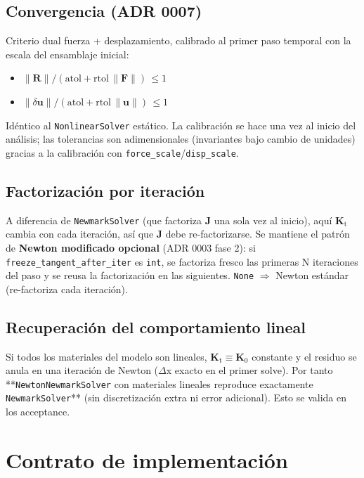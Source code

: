 \documentclass[11pt,letterpaper,oneside]{report}
\begin{document}
\subsection{Convergencia (ADR 0007)}

Criterio dual fuerza + desplazamiento, calibrado al primer paso temporal con
la escala del ensamblaje inicial:

\begin{itemize}
  \item $\|\mathbf R\|/(\text{atol} + \text{rtol}\,\|\mathbf F\|)\,\leq 1$
  \item $\|\delta \mathbf u\|/(\text{atol} + \text{rtol}\,\|\mathbf u\|)\,\leq 1$
\end{itemize}

Idéntico al \texttt{NonlinearSolver} estático. La calibración se hace una vez al
inicio del análisis; las tolerancias son adimensionales (invariantes bajo
cambio de unidades) gracias a la calibración con \texttt{force\_scale}/\texttt{disp\_scale}.

\subsection{Factorización por iteración}

A diferencia de \texttt{NewmarkSolver} (que factoriza $\mathbf J$ una sola vez al
inicio), aquí $\mathbf K_\text{t}$ cambia con cada iteración, así que $\mathbf J$
debe re-factorizarse. Se mantiene el patrón de \textbf{Newton modificado opcional}
(ADR 0003 fase 2): si \texttt{freeze\_tangent\_after\_iter} es \texttt{int}, se factoriza fresco
las primeras N iteraciones del paso y se reusa la factorización en las
siguientes. \texttt{None} \ensuremath{\Rightarrow} Newton estándar (re-factoriza cada iteración).

\subsection{Recuperación del comportamiento lineal}

Si todos los materiales del modelo son lineales, $\mathbf K_\text{t} \equiv \mathbf K_0$
constante y el residuo se anula en una iteración de Newton (\ensuremath{\Delta}x exacto en el
primer solve). Por tanto **\texttt{NewtonNewmarkSolver} con materiales lineales
reproduce exactamente \texttt{NewmarkSolver}** (sin discretización extra ni error
adicional). Esto se valida en los acceptance.


\section{Contrato de implementación}
\end{document}
